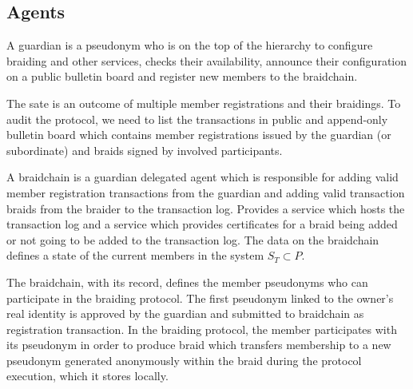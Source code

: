 \documentclass[12pt]{article}
\newenvironment{definition}[2][Definition]{\begin{trivlist}
\item[\hskip \labelsep {\bfseries #1}\hskip \labelsep {\bfseries #2.}]}{\end{trivlist}}
\begin{document}




\subsection*{Agents}

\begin{definition}{(guardian)}
  A guardian is a pseudonym who is on the top of the hierarchy to configure braiding and other services, checks their availability, announce their configuration on a public bulletin board and register new members to the braidchain.
\end{definition}

The sate is an outcome of multiple member registrations and their braidings. To audit the protocol, we need to list the transactions in public and append-only bulletin board which contains member registrations issued by the guardian (or subordinate) and braids signed by involved participants.

\begin{definition}{(braidchain)}
  A braidchain is a guardian delegated agent which is responsible for adding valid member registration transactions from the guardian and adding valid transaction braids from the braider to the transaction log. Provides a service which hosts the transaction log and a service which provides certificates for a braid being added or not going to be added to the transaction log. The data on the braidchain defines a state of the current members in the system $S_T \subset P$. 
\end{definition}

The braidchain, with its record, defines the member pseudonyms who can participate in the braiding protocol. The first pseudonym linked to the owner's real identity is approved by the guardian and submitted to braidchain as registration transaction. In the braiding protocol, the member participates with its pseudonym in order to produce braid which transfers membership to a new pseudonym generated anonymously within the braid during the protocol execution, which it stores locally. 
\end{document}
